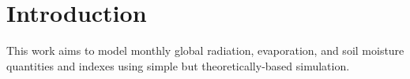%
%
%
%
%
\section{Introduction}
\label{sec:intro}
This work aims to model monthly global radiation, evaporation, and soil moisture quantities and indexes using simple but theoretically-based simulation.

